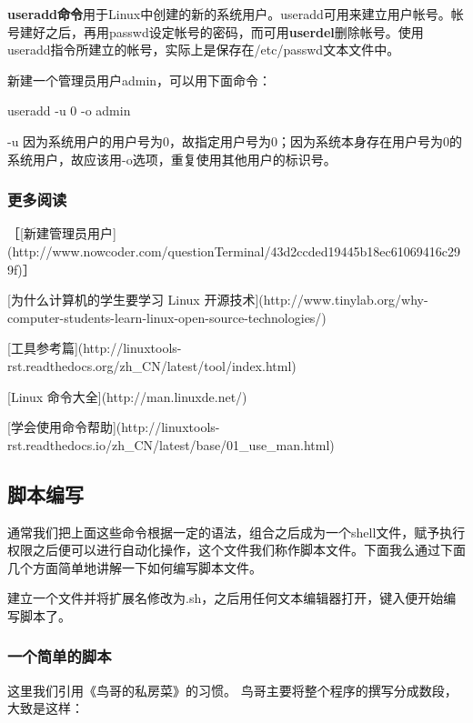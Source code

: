 \textbf{useradd命令}用于Linux中创建的新的系统用户。useradd可用来建立用户帐号。帐号建好之后，再用passwd设定帐号的密码，而可用\textbf{userdel}删除帐号。使用useradd指令所建立的帐号，实际上是保存在/etc/passwd文本文件中。

新建一个管理员用户admin，可以用下面命令：

\begin{Code}
useradd -u 0 -o admin
\end{Code}

-u 因为系统用户的用户号为0，故指定用户号为0；因为系统本身存在用户号为0的系统用户，故应该用-o选项，重复使用其他用户的标识号。



\subsubsection{更多阅读} 
［[新建管理员用户](http://www.nowcoder.com/questionTerminal/43d2ccded19445b18ec61069416c299f)］

[为什么计算机的学生要学习 Linux 开源技术](http://www.tinylab.org/why-computer-students-learn-linux-open-source-technologies/) 
   
[工具参考篇](http://linuxtools-rst.readthedocs.org/zh_CN/latest/tool/index.html)  

[Linux 命令大全](http://man.linuxde.net/)  

[学会使用命令帮助](http://linuxtools-rst.readthedocs.io/zh_CN/latest/base/01_use_man.html)  

\subsection{脚本编写}
通常我们把上面这些命令根据一定的语法，组合之后成为一个shell文件，赋予执行权限之后便可以进行自动化操作，这个文件我们称作脚本文件。下面我么通过下面几个方面简单地讲解一下如何编写脚本文件。

建立一个文件并将扩展名修改为.sh，之后用任何文本编辑器打开，键入便开始编写脚本了。

\subsubsection{一个简单的脚本}
这里我们引用《鸟哥的私房菜》的习惯。
鸟哥主要将整个程序的撰写分成数段，大致是这样：

